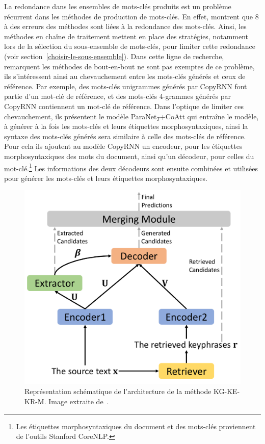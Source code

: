 La redondance dans les ensembles de mots-clés produits est un problème récurrent dans les méthodes de production de mots-clés.
En effet, \citet{hasan_automatic_2014} montrent que 8 à  des erreurs des méthodes sont liées à la redondance des mots-clés.
Ainsi, les méthodes en chaîne de traitement mettent en place des stratégies, notamment lors de la sélection du sous-ensemble de mots-clés, pour limiter cette redondance (voir section~\ref{choisir-le-sous-ensemble}).
Dans cette ligne de recherche, \citet{zhao_incorporating_2019} remarquent les méthodes de bout-en-bout ne sont pas exemptes de ce problème, ils s'intéressent ainsi au chevauchement entre les mots-clés générés et ceux de référence.
Par exemple,  des mots-clés unigrammes générés par CopyRNN font partie d'un mot-clé de référence, et  des mots-clés 4-grammes générés par CopyRNN contiennent un mot-clé de référence.
Dans l'optique de limiter ces chevauchement, ils présentent le modèle ParaNet$_T$+CoAtt qui entraîne le modèle, à générer à la fois les mots-clés et leurs étiquettes morphosyntaxiques, ainsi la syntaxe des mots-clés générés sera similaire à celle des mots-clés de référence.
Pour cela ils ajoutent au modèle CopyRNN un encodeur, pour les étiquettes morphosyntaxiques des mots du document, ainsi qu'un décodeur, pour celles du mot-clé.\footnote{Les étiquettes morphosyntaxiques du document et des mots-clés proviennent de l'outils Stanford CoreNLP.}
Les informations des deux décodeurs sont ensuite combinées et utilisées pour générer les mots-clés et leurs étiquettes morphosyntaxiques.

\begin{figure}
    \centering
    \includegraphics[scale=0.2]{2_production_mots_cles/kg_ke_kr_m.png}
    \caption{Représentation schématique de l'architecture de la méthode KG-KE-KR-M. Image extraite de~\citet{chen_integrated_2019}.}
    \label{fig:schema_kgkekrm}
\end{figure}

